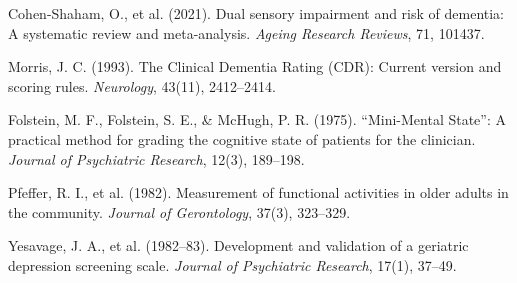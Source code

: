 \documentclass[11pt]{article}
\begin{document}
\begin{enumerate}[label={[\arabic*]}]
    \item Cohen-Shaham, O., et al. (2021). Dual sensory impairment and risk of dementia: A systematic review and meta-analysis. \textit{Ageing Research Reviews}, 71, 101437.
    \item Morris, J. C. (1993). The Clinical Dementia Rating (CDR): Current version and scoring rules. \textit{Neurology}, 43(11), 2412--2414.
    \item Folstein, M. F., Folstein, S. E., \& McHugh, P. R. (1975). ``Mini-Mental State'': A practical method for grading the cognitive state of patients for the clinician. \textit{Journal of Psychiatric Research}, 12(3), 189--198.
    \item Pfeffer, R. I., et al. (1982). Measurement of functional activities in older adults in the community. \textit{Journal of Gerontology}, 37(3), 323--329.
    \item Yesavage, J. A., et al. (1982--83). Development and validation of a geriatric depression screening scale. \textit{Journal of Psychiatric Research}, 17(1), 37--49.
\end{enumerate}
\end{document}
